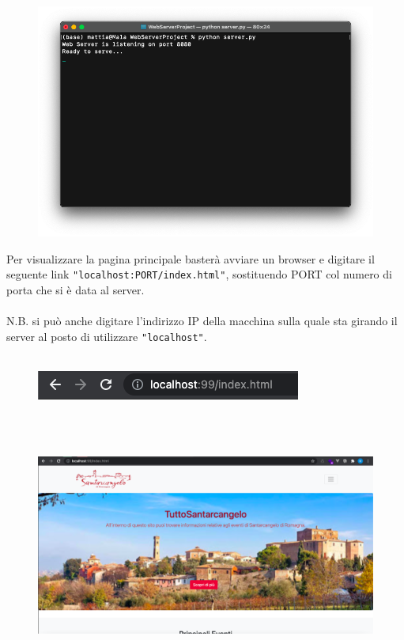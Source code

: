 \documentclass[a4paper,12pt]{report}
\begin{document}
\begin{figure}[ht]
    \begin{center}
        \centering
        \includegraphics[width=\textwidth]{img/Terminale1.png}
    \end{center}
\end{figure}

\clearpage

Per visualizzare la pagina principale basterà avviare un browser e digitare il seguente link \texttt{"localhost:PORT/index.html"}, sostituendo PORT col numero di porta che si è data al server.
\\
\\
N.B. si può anche digitare l'indirizzo IP della macchina sulla quale sta girando il server al posto di utilizzare \texttt{"localhost"}.
\\
\\
\begin{figure}[ht]
    \begin{center}
        \centering
        \includegraphics[scale=.8]{img/Link.png}
    \end{center}
\end{figure}
\\
\\
\begin{figure}[ht]
    \begin{center}
        \centering
        \hspace*{-0.8in}
        \includegraphics[scale=.35]{img/Home1.png}
    \end{center}
\end{figure}
\end{document}
